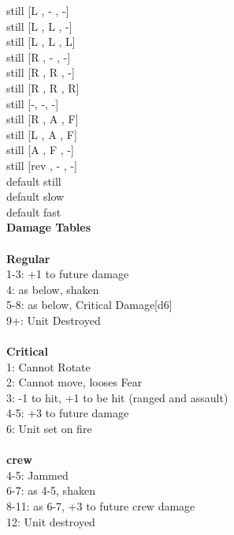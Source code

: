 still [L ,  - ,  -] \\
still [L ,  L ,  -] \\
still [L ,  L ,  L] \\
still [R ,  - ,  -] \\
still [R ,  R ,  -] \\
still [R ,  R ,  R] \\
still [-, -, -] \\
still [R ,  A ,  F] \\
still [L ,  A ,  F] \\
still [A ,  F ,  -] \\
still [rev ,  - ,  -] \\
default still \\
default slow \\
default fast \\


{\bf Damage Tables} \\
\ \\ {\bf Regular } \\
1-3: +1 to future damage \\
4: as below, shaken \\
5-8: as below, Critical Damage[d6] \\
9+: Unit Destroyed \\
\ \\ {\bf Critical } \\
1: Cannot Rotate \\
2: Cannot move, looses Fear \\
3: -1 to hit, +1 to be hit (ranged and assault) \\
4-5: +3 to future damage \\
6: Unit set on fire \\
\ \\ {\bf crew } \\
4-5: Jammed \\
6-7: as 4-5, shaken \\
8-11: as 6-7, +3 to future crew damage \\
12: Unit destroyed \\










